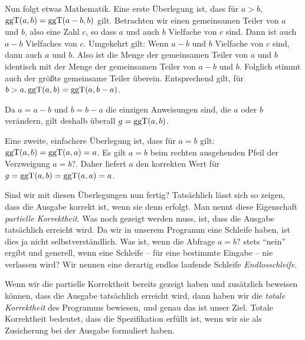 \vspace{1.7mm} %

Nun folgt etwas Mathematik. Eine erste Überlegung ist, dass für $a > b$, ${\text{ggT}}(a,b) = {\text{ggT}}(a-b,b)$ gilt. Betrachten wir einen gemeinsamen Teiler von $a$ und $b$, also eine Zahl $c$, so dass $a$ und auch $b$ Vielfache von $c$ sind. Dann ist auch $a-b$ Vielfaches von $c$. Umgekehrt gilt: Wenn $a - b$ und $b$ Vielfache von $c$ sind, dann auch $a$ und $b$. Also ist die Menge der gemeinsamen Teiler von $a$ und $b$ identisch mit der Menge der gemeinsamen Teiler von $a - b$ und $b$. Folglich stimmt auch der größte gemeinsame Teiler überein. Entsprechend gilt, für $b > a, {\text{ggT}}(a,b) = {\text{ggT}}(a,b-a)$.

\vspace{1.7mm} %

Da $a = a-b$ und $b= b-a$ die einzigen Anweisungen sind, die $a$ oder $b$ verändern, gilt deshalb überall $g = {\text{ggT}}(a,b)$.

\vspace{1.7mm} %

Eine zweite, einfachere Überlegung ist, dass für $a = b$ gilt: ${\text{ggT}}(a,b) = {\text{ggT}}(a,a) = a$. Es gilt $a=b$ beim rechten ausgehenden Pfeil 
der Verzweigung $a=b?$. Daher liefert $a$ den korrekten Wert für $g = {\text{ggT}}(a,b) = {\text{ggT}}(a,a) = a$.

\vspace{1.7mm} %

Sind wir mit diesen Überlegungen nun fertig? Tatsächlich lässt sich so zeigen, dass die Ausgabe korrekt ist, wenn sie denn erfolgt. 
Man nennt diese Eigenschaft \emph{\mbox{partielle} Korrektheit}. Was noch gezeigt werden muss, ist, dass die Ausgabe tatsächlich erreicht wird. Da wir in unserem Programm eine Schleife haben, ist dies ja nicht selbst\-verständlich. Was ist, wenn die Abfrage $a=b?$ stets "`nein"' ergibt und generell, wenn eine Schleife -- für eine bestimmte Eingabe -- nie verlassen wird? Wir nennen eine derartig endlos laufende Schleife \textit{Endlosschleife}.

\vspace{1.7mm} %

Wenn wir die partielle Korrektheit bereits gezeigt haben und zusätzlich beweisen können, dass die Ausgabe tatsächlich erreicht wird, dann haben wir die \emph{totale Korrekt\-heit} des Programms bewiesen, und genau das ist unser Ziel. Totale Korrektheit bedeutet, dass die Spezifikation erfüllt ist, wenn wir sie als Zusicherung bei der Ausgabe formuliert haben.


